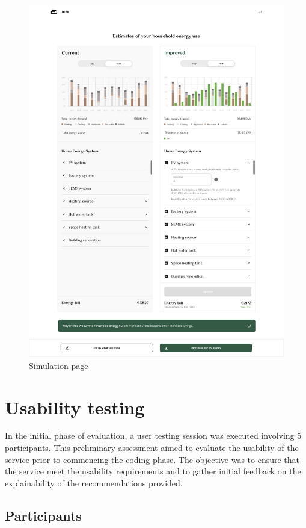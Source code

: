 \begin{figure}[h!]
  \centering
  \includegraphics[width=\textwidth]{Images/explanation.png}
  \caption{Simulation page}
  \label{fig:explanation}
\end{figure}


\section{Usability testing}

In the initial phase of evaluation, a user testing session was executed involving 5 participants.
This preliminary assessment aimed to evaluate the usability of the service prior to commencing the coding phase. 
The objective was to ensure that the service meet the usability requirements and 
to gather initial feedback on the explainability of the recommendations provided. 


\subsection{Participants}

